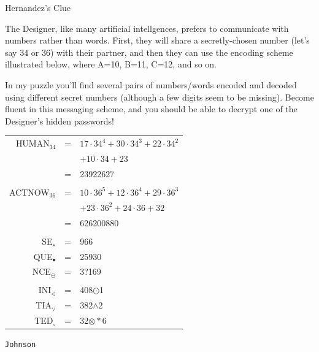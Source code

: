 \documentclass{article}
\newcommand{\clue}[1]{#1}
\newcommand{\puzzleTitle}[1]{
\begin{center}
{\Large \texttt{#1}}
\end{center}
}
\begin{document}
\vfill

\newpage

\clue{
Hernandez's Clue

The Designer, like many artificial intellgences,
prefers to communicate with numbers rather than words. First,
they will share a secretly-chosen number (let's say 34 or 36)
with their partner,
and then they can use the encoding scheme illustrated below, where
A=10, B=11, C=12, and so on.

In my puzzle you'll find several pairs of numbers/words
encoded and decoded using
different secret numbers (although a few digits seem
to be missing). Become fluent in this messaging
scheme, and you should be able to decrypt one of the Designer's
hidden passwords!

\vspace{0.5cm}
\begin{center}\LARGE
\begin{tabular}{rcl}
 HUMAN$_{34}$ &=&
$17\cdot34^4+30\cdot34^3+22\cdot34^2$\\&&
$+10\cdot34+23$ \\&=& 23922627 \\
\vspace*{0.5cm} \\
 ACTNOW$_{36}$ &=&
$10\cdot36^5+12\cdot36^4+29\cdot36^3$\\&&
$+23\cdot36^2+24\cdot36+32$ \\ &=& 626200880\\
\vspace*{0.5cm} \\
 SE$_\star$ & =&966 \\
 QUE$_\bullet$ & =&25930 \\
 NCE$_\ominus$ & =&3?169 \\
\vspace*{0.5cm} \\
 INI$_\triangleleft$ & =&408$\odot$1 \\
 TIA$_\vee$ & =&382$\wedge$2 \\
 TED$_\circ$ & =&32$\otimes\ast$6 \\
\end{tabular}
\end{center}

}

\newpage

\puzzleTitle{Johnson}

\vfill
\end{document}
